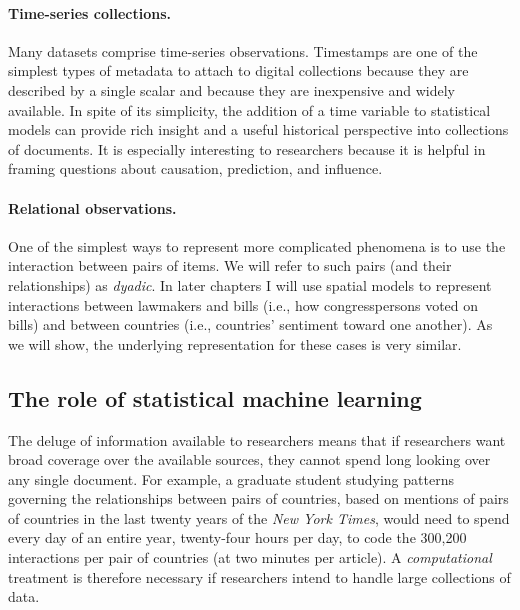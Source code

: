 \paragraph{Time-series collections.}  Many datasets comprise
time-series observations.  Timestamps are one of the simplest types of
metadata to attach to digital collections because they are described
by a single scalar and because they are inexpensive and widely
available.  In spite of its simplicity, the addition of a time
variable to statistical models can provide rich insight and a useful
historical perspective into collections of documents.  It is
especially interesting to researchers because it is helpful in framing
questions about causation, prediction, and influence.

\paragraph{Relational observations.}
One of the simplest ways to represent more complicated phenomena is to
use the interaction between pairs of items.  We will refer to such
pairs (and their relationships) as \emph{dyadic}. In later chapters I
will use spatial models to represent interactions between lawmakers
and bills (i.e., how congresspersons voted on bills) and between
countries (i.e., countries' sentiment toward one another).  As we will
show, the underlying representation for these cases is very similar.

\subsection*{The role of statistical machine learning}

The deluge of information available to researchers means that if
researchers want broad coverage over the available sources, they
cannot spend long looking over any single document.  For example, a
graduate student studying patterns governing the relationships between
pairs of countries, based on mentions of pairs of countries in the
last twenty years of the \emph{New York Times}, would need to spend
every day of an entire year, twenty-four hours per day, to code the
300,200 interactions per pair of countries (at two minutes per
article).  A \emph{computational} treatment is therefore necessary if
researchers intend to handle large collections of data.


